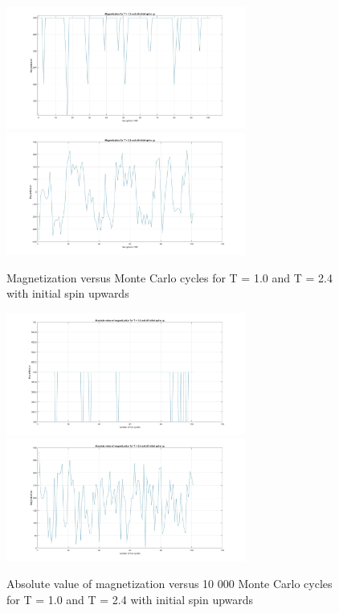 \documentclass[10pt,a4paper]{article}
\begin{document}
\begin{figure}[H]
\centerline{
\includegraphics[width=0.7\textwidth]{magnetizationT1upspin}
\includegraphics[width=0.7\textwidth]{magnetizationT24upspin}
}
\caption{Magnetization versus Monte Carlo cycles for T = 1.0 and T = 2.4 with initial spin upwards}
\label{fig:magneticupspin}
\end{figure}

\begin{figure}[H]
\centerline{
\includegraphics[width=0.7\textwidth]{absmagnetizationT1upspin}
\includegraphics[width=0.7\textwidth]{absmagnetizationT24upspin}
}
\caption{Absolute value of magnetization versus 10 000 Monte Carlo cycles for T = 1.0 and T = 2.4 with initial spin upwards}
\label{fig:absmagneticupspin}
\end{figure}
\end{document}
